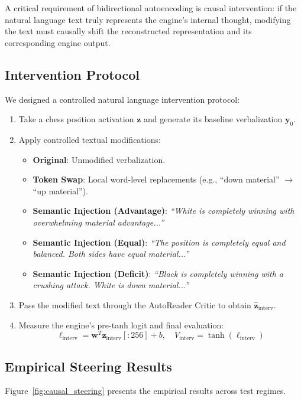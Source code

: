 \documentclass[10pt,twocolumn]{article}
\begin{document}
A critical requirement of bidirectional autoencoding is causal intervention: if the natural language text truly represents the engine's internal thought, modifying the text must causally shift the reconstructed representation and its corresponding engine output.

\subsection{Intervention Protocol}
We designed a controlled natural language intervention protocol:
\begin{enumerate}
    \item Take a chess position activation $\mathbf{z}$ and generate its baseline verbalization $\mathbf{y}_0$.
    \item Apply controlled textual modifications:
    \begin{itemize}
        \item \textbf{Original}: Unmodified verbalization.
        \item \textbf{Token Swap}: Local word-level replacements (e.g., ``down material'' $\to$ ``up material'').
        \item \textbf{Semantic Injection (Advantage)}: \textit{``White is completely winning with overwhelming material advantage...''}
        \item \textbf{Semantic Injection (Equal)}: \textit{``The position is completely equal and balanced. Both sides have equal material...''}
        \item \textbf{Semantic Injection (Deficit)}: \textit{``Black is completely winning with a crushing attack. White is down material...''}
    \end{itemize}
    \item Pass the modified text through the AutoReader Critic to obtain $\hat{\mathbf{z}}_{\text{interv}}$.
    \item Measure the engine's pre-tanh logit and final evaluation:
    \begin{equation}
        \ell_{\text{interv}} = \mathbf{w}^T \hat{\mathbf{z}}_{\text{interv}}[:256] + b, \quad V_{\text{interv}} = \tanh(\ell_{\text{interv}})
    \end{equation}
\end{enumerate}

\subsection{Empirical Steering Results}
Figure~\ref{fig:causal_steering} presents the empirical results across test regimes.
\end{document}

